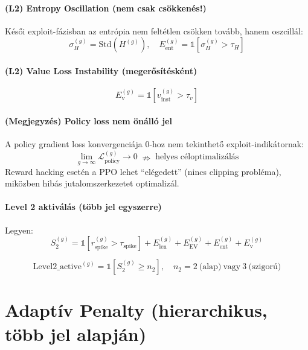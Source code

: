 \documentclass{article}
\begin{document}
\paragraph{(L2) Entropy Oscillation (nem csak csökkenés!) }
Késői exploit-fázisban az entrópia nem feltétlen csökken tovább, hanem oszcillál:
\begin{equation}
\sigma_H^{(g)} = \mathrm{Std}(H^{(g)}),\quad
E_{\text{ent}}^{(g)}=\mathbb{1}[\sigma_H^{(g)}>\tau_H]
\end{equation}

\paragraph{(L2) Value Loss Instability (megerősítésként)}
\begin{equation}
E_{\text{v}}^{(g)} = \mathbb{1}[v_{\text{inst}}^{(g)}>\tau_v]
\end{equation}

\paragraph{(Megjegyzés) Policy loss nem önálló jel}
A policy gradient loss konvergenciája 0-hoz nem tekinthető exploit-indikátornak:
\begin{equation}
\lim_{g\to\infty}\mathcal{L}_{\text{policy}}^{(g)} \to 0 \;\nRightarrow\; \text{helyes céloptimalizálás}
\end{equation}
Reward hacking esetén a PPO lehet ``elégedett'' (nincs clipping probléma), miközben hibás jutalomszerkezetet optimalizál.

\paragraph{Level 2 aktiválás (több jel egyszerre)}
Legyen:
\begin{equation}
S_2^{(g)} =
\mathbb{1}[r_{\text{spike}}^{(g)}>\tau_{\text{spike}}] +
E_{\text{len}}^{(g)} +
E_{\text{EV}}^{(g)} +
E_{\text{ent}}^{(g)} +
E_{\text{v}}^{(g)}
\end{equation}

\begin{equation}
\text{Level2\_active}^{(g)}=\mathbb{1}[S_2^{(g)}\ge n_2],\quad n_2=2\ \text{(alap)}\ \text{vagy}\ 3\ \text{(szigorú)}
\end{equation}

\section{Adaptív Penalty (hierarchikus, több jel alapján)}
\end{document}
